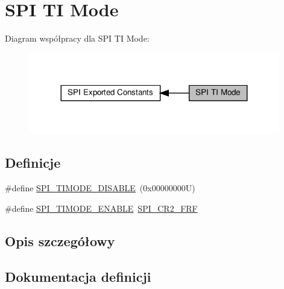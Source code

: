 \hypertarget{group___s_p_i___t_i__mode}{}\section{S\+PI TI Mode}
\label{group___s_p_i___t_i__mode}
Diagram współpracy dla S\+PI TI Mode\+:\nopagebreak
\begin{figure}[H]
\begin{center}
\leavevmode
\includegraphics[width=311pt]{group___s_p_i___t_i__mode}
\end{center}
\end{figure}
\subsection*{Definicje}
\begin{DoxyCompactItemize}
\item 
\#define \hyperlink{group___s_p_i___t_i__mode_gaffbf066ee656a4d56b75fa721a2eabcd}{S\+P\+I\+\_\+\+T\+I\+M\+O\+D\+E\+\_\+\+D\+I\+S\+A\+B\+LE}~(0x00000000\+U)
\item 
\#define \hyperlink{group___s_p_i___t_i__mode_ga8b31d4b25f951edd1dfd7cf6d4387517}{S\+P\+I\+\_\+\+T\+I\+M\+O\+D\+E\+\_\+\+E\+N\+A\+B\+LE}~\hyperlink{group___peripheral___registers___bits___definition_ga09e3f41fa2150831afaac191046087f2}{S\+P\+I\+\_\+\+C\+R2\+\_\+\+F\+RF}
\end{DoxyCompactItemize}


\subsection{Opis szczegółowy}


\subsection{Dokumentacja definicji}
\mbox{\label{group___s_p_i___t_i__mode_gaffbf066ee656a4d56b75fa721a2eabcd}} 
